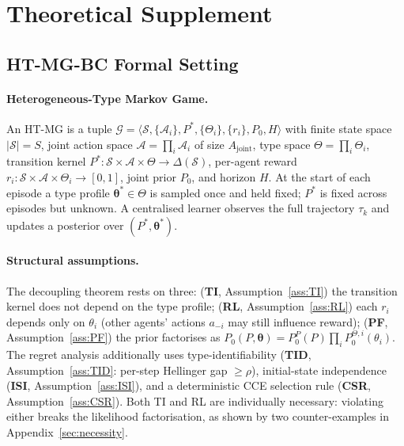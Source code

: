 \section{Theoretical Supplement}
\label{app:theory}

\subsection{HT-MG-BC Formal Setting}
\label{sec:setting-app}

\paragraph{Heterogeneous-Type Markov Game.}
An HT-MG is a tuple
$\mathcal{G} = \langle \mathcal{S}, \{\mathcal{A}_i\}, P^*, \{\Theta_i\}, \{r_i\}, P_0, H \rangle$
with finite state space $|\mathcal S|=S$, joint action space $\mathcal A=\prod_i \mathcal A_i$ of size $A_{\mathrm{joint}}$, type space $\Theta=\prod_i \Theta_i$, transition kernel $P^*\!:\!\mathcal S\!\times\!\mathcal A\!\times\!\Theta\to\Delta(\mathcal S)$, per-agent reward $r_i\!:\!\mathcal S\!\times\!\mathcal A\!\times\!\Theta_i\!\to\![0,1]$, joint prior $P_0$, and horizon $H$. At the start of each episode a type profile $\boldsymbol\theta^* \in \Theta$ is sampled once and held fixed; $P^*$ is fixed across episodes but unknown. A centralised learner observes the full trajectory $\tau_k$ and updates a posterior over $(P^*, \boldsymbol\theta^*)$.

\paragraph{Structural assumptions.} The decoupling theorem rests on three:
(\textbf{TI}, Assumption~\ref{ass:TI}) the transition kernel does not depend on the type profile;
(\textbf{RL}, Assumption~\ref{ass:RL}) each $r_i$ depends only on $\theta_i$ (other agents' actions $a_{-i}$ may still influence reward);
(\textbf{PF}, Assumption~\ref{ass:PF}) the prior factorises as $P_0(P,\boldsymbol\theta)=P_0^P(P)\prod_i P_0^{\Theta,i}(\theta_i)$.
The regret analysis additionally uses type-identifiability (\textbf{TID}, Assumption~\ref{ass:TID}: per-step Hellinger gap $\geq\rho$), initial-state independence (\textbf{ISI}, Assumption~\ref{ass:ISI}), and a deterministic CCE selection rule (\textbf{CSR}, Assumption~\ref{ass:CSR}). Both TI and RL are individually necessary: violating either breaks the likelihood factorisation, as shown by two counter-examples in Appendix~\ref{sec:necessity}.

